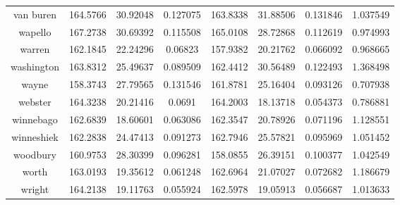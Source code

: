 \begin{table}[H]
\begin{tabular}{|c|ccc|ccc|c|}
van buren     & 164.5766 & 30.92048       & 0.127075 & 163.8338 & 31.88506       & 0.131846 & 1.037549 \\
wapello       & 167.2738 & 30.69392       & 0.115508 & 165.0108 & 28.72868       & 0.112619 & 0.974993 \\
warren        & 162.1845 & 22.24296       & 0.06823  & 157.9382 & 20.21762       & 0.066092 & 0.968665 \\
washington    & 163.8312 & 25.49637       & 0.089509 & 162.4412 & 30.56489       & 0.122493 & 1.368498 \\
wayne         & 158.3743 & 27.79565       & 0.131546 & 161.8781 & 25.16404       & 0.093126 & 0.707938 \\
webster       & 164.3238 & 20.21416       & 0.0691   & 164.2003 & 18.13718       & 0.054373 & 0.786881 \\
winnebago     & 162.6839 & 18.60601       & 0.063086 & 162.3547 & 20.78926       & 0.071196 & 1.128551 \\
winneshiek    & 162.2838 & 24.47413       & 0.091273 & 162.7946 & 25.57821       & 0.095969 & 1.051452 \\
woodbury      & 160.9753 & 28.30399       & 0.096281 & 158.0855 & 26.39151       & 0.100377 & 1.042549 \\
worth         & 163.0193 & 19.35612       & 0.061248 & 162.6964 & 21.07027       & 0.072682 & 1.186679 \\
wright        & 164.2138 & 19.11763       & 0.055924 & 162.5978 & 19.05913       & 0.056687 & 1.013633


\\
\hline
\end{tabular}
\end{table}

